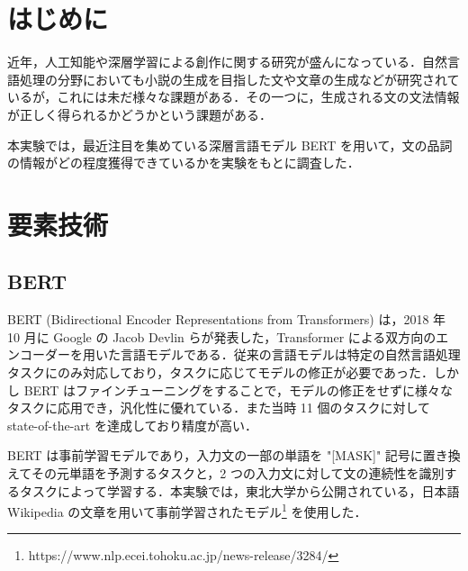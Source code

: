 \documentclass[twocolumn]{jarticle}
\begin{document}

\section{はじめに}
近年，人工知能や深層学習による創作に関する研究が盛んになっている．自然言語処理の分野においても小説の生成を目指した文や文章の生成などが研究されているが，これには未だ様々な課題がある．その一つに，生成される文の文法情報が正しく得られるかどうかという課題がある．\par
本実験では，最近注目を集めている深層言語モデル BERT を用いて，文の品詞の情報がどの程度獲得できているかを実験をもとに調査した．


\section{要素技術}

  \subsection{BERT}
BERT (Bidirectional Encoder Representations from Transformers) \cite{DBLP} は，2018 年 10 月に Google の Jacob Devlin らが発表した，Transformer による双方向のエンコーダーを用いた言語モデルである．従来の言語モデルは特定の自然言語処理タスクにのみ対応しており，タスクに応じてモデルの修正が必要であった．しかし BERT はファインチューニングをすることで，モデルの修正をせずに様々なタスクに応用でき，汎化性に優れている．また当時 11 個のタスクに対して state-of-the-art を達成しており精度が高い．\par
BERT は事前学習モデルであり，入力文の一部の単語を "[MASK]" 記号に置き換えてその元単語を予測するタスクと，2 つの入力文に対して文の連続性を識別するタスクによって学習する．本実験では，東北大学から公開されている，日本語 Wikipedia の文章を用いて事前学習されたモデル\footnote{https://www.nlp.ecei.tohoku.ac.jp/news-release/3284/} を使用した．
\end{document}
